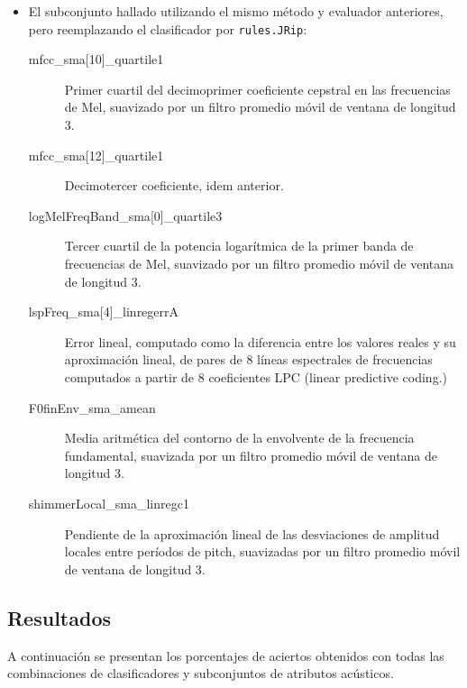 \documentclass[10pt,a4paper]{article}
\begin{document}
\begin{itemize}
  \item El subconjunto hallado utilizando el mismo método y evaluador anteriores, pero reemplazando el clasificador por \texttt{rules.JRip}:
  \begin{description}
    \item[mfcc\_sma{[}10{]}\_quartile1] Primer cuartil del decimoprimer coeficiente cepstral en las frecuencias de Mel, suavizado por un filtro promedio móvil de ventana de longitud 3.
    \item[mfcc\_sma{[}12{]}\_quartile1] Decimotercer coeficiente, idem anterior.
    \item[logMelFreqBand\_sma{[}0{]}\_quartile3] Tercer cuartil de la potencia logarítmica de la primer banda de frecuencias de Mel, suavizado por un filtro promedio móvil de ventana de longitud 3.
    \item[lspFreq\_sma{[}4{]}\_linregerrA] Error lineal, computado como la diferencia entre los valores reales y su aproximación lineal, de pares de 8 líneas espectrales de frecuencias computados a partir de 8 coeficientes LPC (linear predictive coding.)
    \item[F0finEnv\_sma\_amean] Media aritmética del contorno de la envolvente de la frecuencia fundamental, suavizada por un filtro promedio móvil de ventana de longitud 3.
    \item[shimmerLocal\_sma\_linregc1] Pendiente de la aproximación lineal de las desviaciones de amplitud locales entre períodos de pitch, suavizadas por un filtro promedio móvil de ventana de longitud 3.
  \end{description}  
\end{itemize}

\subsection{Resultados}

A continuación se presentan los porcentajes de aciertos obtenidos con todas las combinaciones de clasificadores y subconjuntos de atributos acústicos.
\end{document}
